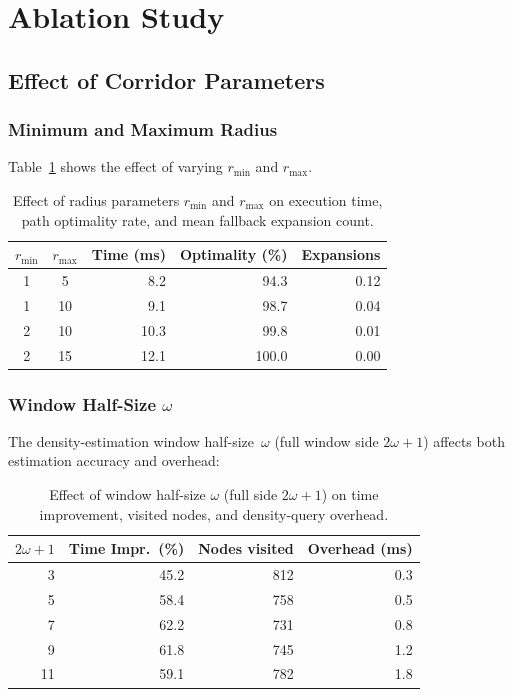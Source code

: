 \documentclass[journal]{IEEEtran}
\begin{document}
\section{Ablation Study}
\label{sec:ablation}

\subsection{Effect of Corridor Parameters}

\subsubsection{Minimum and Maximum Radius}
Table~\ref{tab:ablation_radius} shows the effect of varying $r_{\min}$ and $r_{\max}$.

\begin{table}[h]
\centering
\caption{Effect of radius parameters $r_{\min}$ and $r_{\max}$ on execution time, path optimality rate, and mean fallback expansion count.}
\label{tab:ablation_radius}
\footnotesize
\begin{tabular}{ccrrr}
\toprule
$r_{\min}$ & $r_{\max}$ & Time (ms) & Optimality (\%) & Expansions \\
\midrule
1 & 5  & 8.2  & 94.3  & 0.12 \\
1 & 10 & 9.1  & 98.7  & 0.04 \\
2 & 10 & 10.3 & 99.8  & 0.01 \\
2 & 15 & 12.1 & 100.0 & 0.00 \\
\bottomrule
\end{tabular}
\normalsize
\end{table}

\subsubsection{Window Half-Size $\omega$}
The density-estimation window half-size~$\omega$ (full window side $2\omega{+}1$) affects both estimation accuracy and overhead:

\begin{table}[h]
\centering
\caption{Effect of window half-size $\omega$ (full side $2\omega{+}1$) on time improvement, visited nodes, and density-query overhead.}
\label{tab:ablation_window}
\footnotesize
\begin{tabular}{rrrr}
\toprule
$2\omega{+}1$ & Time Impr.\ (\%) & Nodes visited & Overhead (ms) \\
\midrule
3  & 45.2 & 812 & 0.3 \\
5  & 58.4 & 758 & 0.5 \\
7  & 62.2 & 731 & 0.8 \\
9  & 61.8 & 745 & 1.2 \\
11 & 59.1 & 782 & 1.8 \\
\bottomrule
\end{tabular}
\normalsize
\end{table}
\end{document}
